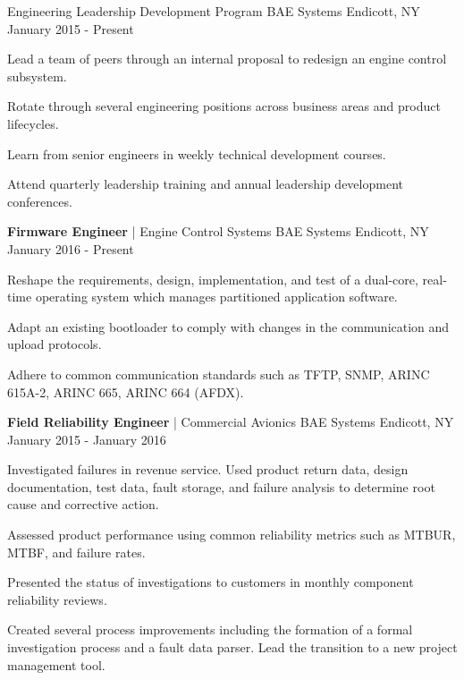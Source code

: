 \begin{cventries}
  \cventry
    {Engineering Leadership Development Program}
    {BAE Systems}
    {Endicott, NY}
    {January 2015 - Present}
    {
      \begin{cvitems}
      	\item {Lead a team of peers through an internal proposal to redesign an engine control subsystem.}
        \item {Rotate through several engineering positions across business areas and product lifecycles.}
        \item {Learn from senior engineers in weekly technical development courses.}
        \item {Attend quarterly leadership training and annual leadership development conferences.}
      \end{cvitems}
    }
  \cventrytwo
    {\textbf{Firmware Engineer} | Engine Control Systems}
    {BAE Systems}
    {Endicott, NY}
    {January 2016 - Present}
    {
      \begin{cvitemstwo}
        \item{Reshape the requirements, design, implementation, and test of a dual-core, real-time operating system which manages partitioned application software.}
        \item{Adapt an existing bootloader to comply with changes in the communication and upload protocols.}
        \item{Adhere to common communication standards such as TFTP, SNMP, ARINC 615A-2, ARINC 665, ARINC 664 (AFDX).}
      \end{cvitemstwo}
    }
  \cventrytwo
    {\textbf{Field Reliability Engineer} | Commercial Avionics}
    {BAE Systems}
    {Endicott, NY}
    {January 2015 - January 2016}
    {
      \begin{cvitemstwo}
        \item {Investigated failures in revenue service. Used product return data, design documentation, test data, fault storage, and failure analysis to determine root cause and corrective action.}
        \item {Assessed product performance using common reliability metrics such as MTBUR, MTBF, and failure rates.}
        \item {Presented the status of investigations to customers in monthly component reliability reviews.}
        \item {Created several process improvements including the formation of a formal investigation process and a fault data parser. Lead the transition to a new project management tool.}

\end{cvitemstwo}}
\end{cventries}
